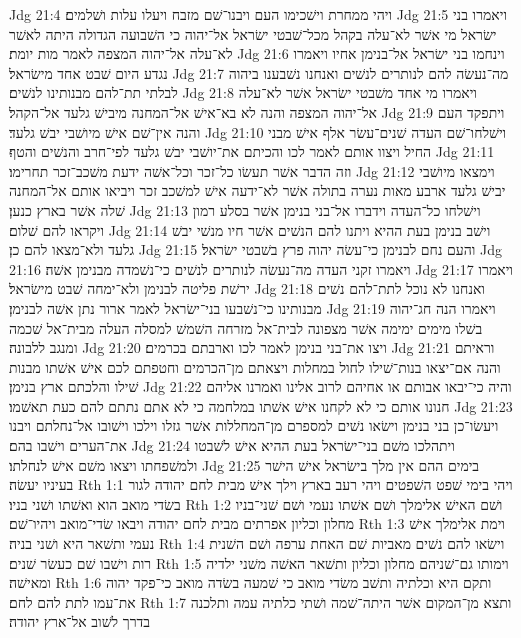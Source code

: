 Jdg 21:4  ויהי ממחרת וישׁכימו העם ויבנו־שׁם מזבח ויעלו עלות ושׁלמים׃
Jdg 21:5  ויאמרו בני ישׂראל מי אשׁר לא־עלה בקהל מכל־שׁבטי ישׂראל אל־יהוה כי השׁבועה הגדולה היתה לאשׁר לא־עלה אל־יהוה המצפה לאמר מות יומת׃
Jdg 21:6  וינחמו בני ישׂראל אל־בנימן אחיו ויאמרו נגדע היום שׁבט אחד מישׂראל׃
Jdg 21:7  מה־נעשׂה להם לנותרים לנשׁים ואנחנו נשׁבענו ביהוה לבלתי תת־להם מבנותינו לנשׁים׃
Jdg 21:8  ויאמרו מי אחד משׁבטי ישׂראל אשׁר לא־עלה אל־יהוה המצפה והנה לא בא־אישׁ אל־המחנה מיבישׁ גלעד אל־הקהל׃
Jdg 21:9  ויתפקד העם והנה אין־שׁם אישׁ מיושׁבי יבשׁ גלעד׃
Jdg 21:10  וישׁלחו־שׁם העדה שׁנים־עשׂר אלף אישׁ מבני החיל ויצוו אותם לאמר לכו והכיתם את־יושׁבי יבשׁ גלעד לפי־חרב והנשׁים והטף׃
Jdg 21:11  וזה הדבר אשׁר תעשׂו כל־זכר וכל־אשׁה ידעת משׁכב־זכר תחרימו׃
Jdg 21:12  וימצאו מיושׁבי יבישׁ גלעד ארבע מאות נערה בתולה אשׁר לא־ידעה אישׁ למשׁכב זכר ויביאו אותם אל־המחנה שׁלה אשׁר בארץ כנען׃
Jdg 21:13  וישׁלחו כל־העדה וידברו אל־בני בנימן אשׁר בסלע רמון ויקראו להם שׁלום׃
Jdg 21:14  וישׁב בנימן בעת ההיא ויתנו להם הנשׁים אשׁר חיו מנשׁי יבשׁ גלעד ולא־מצאו להם כן׃
Jdg 21:15  והעם נחם לבנימן כי־עשׂה יהוה פרץ בשׁבטי ישׂראל׃
Jdg 21:16  ויאמרו זקני העדה מה־נעשׂה לנותרים לנשׁים כי־נשׁמדה מבנימן אשׁה׃
Jdg 21:17  ויאמרו ירשׁת פליטה לבנימן ולא־ימחה שׁבט מישׂראל׃
Jdg 21:18  ואנחנו לא נוכל לתת־להם נשׁים מבנותינו כי־נשׁבעו בני־ישׂראל לאמר ארור נתן אשׁה לבנימן׃
Jdg 21:19  ויאמרו הנה חג־יהוה בשׁלו מימים ימימה אשׁר מצפונה לבית־אל מזרחה השׁמשׁ למסלה העלה מבית־אל שׁכמה ומנגב ללבונה׃
Jdg 21:20  ויצו את־בני בנימן לאמר לכו וארבתם בכרמים׃
Jdg 21:21  וראיתם והנה אם־יצאו בנות־שׁילו לחול במחלות ויצאתם מן־הכרמים וחטפתם לכם אישׁ אשׁתו מבנות שׁילו והלכתם ארץ בנימן׃
Jdg 21:22  והיה כי־יבאו אבותם או אחיהם לרוב אלינו ואמרנו אליהם חנונו אותם כי לא לקחנו אישׁ אשׁתו במלחמה כי לא אתם נתתם להם כעת תאשׁמו׃
Jdg 21:23  ויעשׂו־כן בני בנימן וישׂאו נשׁים למספרם מן־המחללות אשׁר גזלו וילכו וישׁובו אל־נחלתם ויבנו את־הערים וישׁבו בהם׃
Jdg 21:24  ויתהלכו משׁם בני־ישׂראל בעת ההיא אישׁ לשׁבטו ולמשׁפחתו ויצאו משׁם אישׁ לנחלתו׃
Jdg 21:25  בימים ההם אין מלך בישׂראל אישׁ הישׁר בעיניו יעשׂה׃
Rth 1:1  ויהי בימי שׁפט השׁפטים ויהי רעב בארץ וילך אישׁ מבית לחם יהודה לגור בשׂדי מואב הוא ואשׁתו ושׁני בניו׃
Rth 1:2  ושׁם האישׁ אלימלך ושׁם אשׁתו נעמי ושׁם שׁני־בניו מחלון וכליון אפרתים מבית לחם יהודה ויבאו שׂדי־מואב ויהיו־שׁם׃
Rth 1:3  וימת אלימלך אישׁ נעמי ותשׁאר היא ושׁני בניה׃
Rth 1:4  וישׂאו להם נשׁים מאביות שׁם האחת ערפה ושׁם השׁנית רות וישׁבו שׁם כעשׂר שׁנים׃
Rth 1:5  וימותו גם־שׁניהם מחלון וכליון ותשׁאר האשׁה משׁני ילדיה ומאישׁה׃
Rth 1:6  ותקם היא וכלתיה ותשׁב משׂדי מואב כי שׁמעה בשׂדה מואב כי־פקד יהוה את־עמו לתת להם לחם׃
Rth 1:7  ותצא מן־המקום אשׁר היתה־שׁמה ושׁתי כלתיה עמה ותלכנה בדרך לשׁוב אל־ארץ יהודה׃
